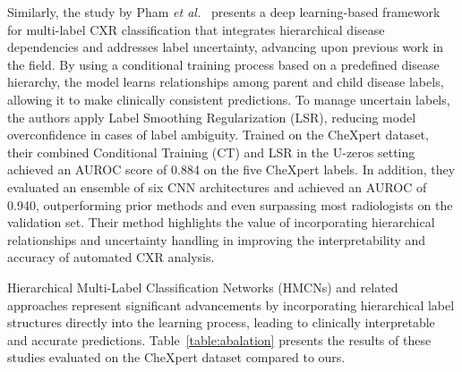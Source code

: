 Similarly, the study by Pham \textit{et al.}~\cite{Pham2021hierarchical} presents a deep learning-based framework for multi-label CXR classification that integrates hierarchical disease dependencies and addresses label uncertainty, advancing upon previous work in the field. By using a conditional training process based on a predefined disease hierarchy, the model learns relationships among parent and child disease labels, allowing it to make clinically consistent predictions. To manage uncertain labels, the authors apply Label Smoothing Regularization (LSR), reducing model overconfidence in cases of label ambiguity. Trained on the CheXpert dataset, their combined Conditional Training (CT) and LSR in the U-zeros setting achieved an AUROC score of 0.884 on the five CheXpert labels. In addition, they evaluated an ensemble of six CNN architectures and achieved an AUROC of 0.940, outperforming prior methods and even surpassing most radiologists on the validation set. Their method highlights the value of incorporating hierarchical relationships and uncertainty handling in improving the interpretability and accuracy of automated CXR analysis.

Hierarchical Multi-Label Classification Networks (HMCNs) and related approaches represent significant advancements by incorporating hierarchical label structures directly into the learning process, leading to clinically interpretable and accurate predictions.  Table~\ref{table:abalation} presents the results of these studies evaluated on the CheXpert dataset compared to ours.